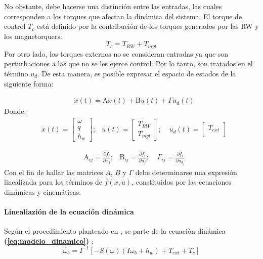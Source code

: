 No obstante, debe hacerse una distinción entre las entradas, las cuales corresponden a los torques que afectan la dinámica del sistema. El torque de control $T_c$ está definido por la contribución de los torques generados por las RW y los magnetorquers:
$$ T_c = T_{RW} +T_{mgt}$$
Por otro lado, los torques externos no se consideran entradas ya que son perturbaciones a las que no se les ejerce control. Por lo tanto, son tratados en el término $u_d$. De esta manera, es posible expresar el espacio de estados de la siguiente forma:
 
\begin{equation}\label{eq:espacio_de_estados}
	\begin{aligned}
		& \dot{x}(t) =\mathrm{A}x(t)+ \mathrm{B}u(t)+ \Gamma u_d(t)
	\end{aligned}
\end{equation}	
\noindent Donde: 
\begin{equation}\label{eq:estados_y_entradas}
	\begin{aligned}
		& x(t) = \left[\begin{array}{c}
			\omega \\
			q \\
			h_{w}
		\end{array}\right];
		& u(t) = \left[\begin{array}{c}
			T_{RW} \\
			T_{mgt}
		\end{array}\right]; 
		&\;u_d(t) = \left[\begin{array}{c}
			T_{ext} \\		
		\end{array}\right]		
	\end{aligned}
\end{equation}

\begin{equation}
	\begin{aligned}		
		&\mathrm{A}_{ij}= \frac{\partial f_i}{\partial x_j};	
		&\mathrm{B}_{ij}= \frac{\partial f_i}{\partial u_j};	
		&\;\Gamma_{ij}= \frac{\partial f_i}{\partial u_{d_j}}		
	\end{aligned}
\end{equation}
Con el fin de hallar las matrices $A$, $B$ y $\Gamma$ debe determinarse una expresión linealizada para los términos de $f(x,u)$, constituidos por las ecuaciones dinámicas y cinemáticas.

\paragraph{Linealiazión de la ecuación dinámica}
\hfill \break
Según el procedimiento planteado en \cite{Andresen2005}, se parte de la ecuación dinámica \textbf{(\ref{eq:modelo_dinamico})} :
$$
 \dot{\omega_b}=I^{-1}\left[-S(\omega)\left(I \omega_b+h_w\right)+T_{ext}+T_c\right]
$$

